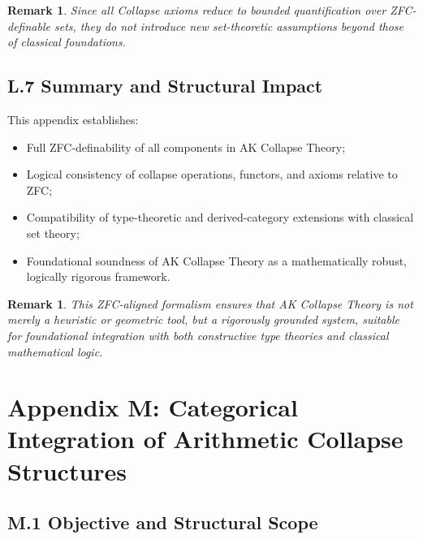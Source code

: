 \documentclass[11pt]{article}
\newtheorem{remark}[theorem]{Remark}
\begin{document}
\begin{remark}
Since all Collapse axioms reduce to bounded quantification over ZFC-definable sets,  
they do not introduce new set-theoretic assumptions beyond those of classical foundations.
\end{remark}

\subsection*{L.7 Summary and Structural Impact}

This appendix establishes:

\begin{itemize}
    \item Full ZFC-definability of all components in AK Collapse Theory;
    \item Logical consistency of collapse operations, functors, and axioms relative to ZFC;
    \item Compatibility of type-theoretic and derived-category extensions with classical set theory;
    \item Foundational soundness of AK Collapse Theory as a mathematically robust, logically rigorous framework.
\end{itemize}

\begin{remark}
This ZFC-aligned formalism ensures that AK Collapse Theory is not merely a heuristic or geometric tool,  
but a rigorously grounded system, suitable for foundational integration with both constructive type theories and classical mathematical logic.
\end{remark}




\section*{Appendix M: Categorical Integration of Arithmetic Collapse Structures}

\subsection*{M.1 Objective and Structural Scope}
\end{document}
